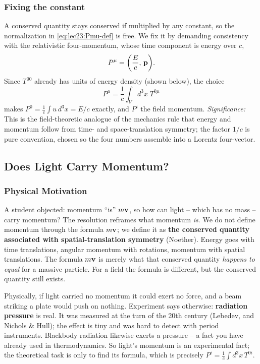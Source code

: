 \subsubsection*{Fixing the constant}
A conserved quantity stays conserved if multiplied by any constant, so the normalization in
\eqref{eq:lec23:Pmu-def} is free. We fix it by demanding consistency with the relativistic
four-momentum, whose time component is energy over $c$,
\begin{equation}\label{eq:lec23:fourmomentum}
  P^\mu=\qty(\frac{E}{c},\,\mathbf{p}).
\end{equation}
Since $T^{00}$ already has units of energy density (shown below), the choice
\begin{equation}\label{eq:lec23:const-choice}
  \boxed{\;P^\mu=\frac1c\int_V d^3x\;T^{0\mu}\;}
\end{equation}
makes $P^0=\tfrac1c\int u\,d^3x=E/c$ exactly, and $P^i$ the field momentum.
\textit{Significance:} This is the field-theoretic analogue of the mechanics rule that
energy and momentum follow from time- and space-translation symmetry; the factor $1/c$ is
pure convention, chosen so the four numbers assemble into a Lorentz four-vector.

\subsection{Does Light Carry Momentum?}
\label{subsec:lec23:light-momentum}

\subsubsection*{Physical Motivation}
A student objected: momentum ``is'' $m\mathbf{v}$, so how can light -- which has no mass --
carry momentum? The resolution reframes what momentum \emph{is}. We do not define momentum
through the formula $m\mathbf{v}$; we define it as \textbf{the conserved quantity associated
with spatial-translation symmetry} (Noether). Energy goes with time translations, angular
momentum with rotations, momentum with spatial translations. The formula $m\mathbf{v}$ is
merely what that conserved quantity \emph{happens to equal} for a massive particle. For a
field the formula is different, but the conserved quantity still exists.

\begin{remark}
Physically, if light carried no momentum it could exert no force, and a beam striking a
plate would push on nothing. Experiment says otherwise: \textbf{radiation pressure} is
real. It was measured at the turn of the 20th century (Lebedev, and Nichols \& Hull); the
effect is tiny and was hard to detect with period instruments. Blackbody radiation
likewise exerts a pressure -- a fact you have already used in thermodynamics. So light's
momentum is an experimental fact; the theoretical task is only to find its formula, which
is precisely $P^i=\tfrac1c\int d^3x\,T^{0i}$.
\end{remark}

